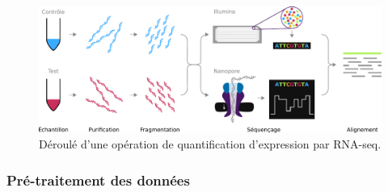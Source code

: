 \begin{figure}
    \centering
    \includegraphics[width=\textwidth]{img/intro/2_meth_transcripto/intro_2_rnaseq_workflpow.pdf}
    \caption{Déroulé d'une opération de quantification d'expression par RNA-seq.}
    \label{fig:intro_rnaseq_workflow}
\end{figure}


\subsubsection{Pré-traitement des données}

